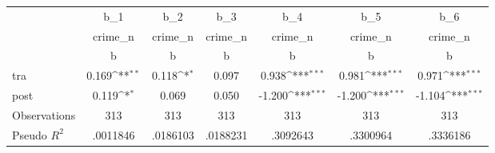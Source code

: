 {
\def\sym#1{\ifmmode^{#1}\else\(^{#1}\)\fi}
\begin{tabular}{l*{6}{c}}
\toprule
                    &         b\_1         &         b\_2         &         b\_3         &         b\_4         &         b\_5         &         b\_6         \\
                    &     crime\_n         &     crime\_n         &     crime\_n         &     crime\_n         &     crime\_n         &     crime\_n         \\
                    &           b         &           b         &           b         &           b         &           b         &           b         \\
\midrule
tra                 &       0.169\sym{**} &       0.118\sym{*}  &       0.097         &       0.938\sym{***}&       0.981\sym{***}&       0.971\sym{***}\\
post                &       0.119\sym{*}  &       0.069         &       0.050         &      -1.200\sym{***}&      -1.200\sym{***}&      -1.104\sym{***}\\
\midrule
Observations        &         313         &         313         &         313         &         313         &         313         &         313         \\
Pseudo \(R^{2}\)    &    .0011846         &    .0186103         &    .0188231         &    .3092643         &    .3300964         &    .3336186         \\
\bottomrule
\end{tabular}
}
